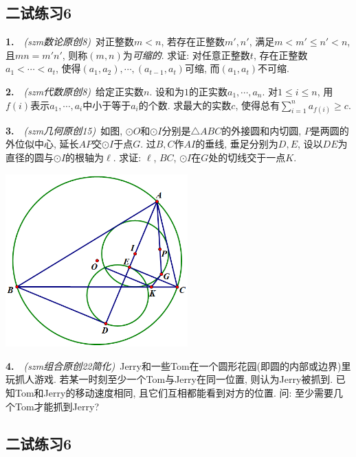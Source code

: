 \newpage
\subsection*{二试练习6}

\textbf{1.}~~\textit{(szm数论原创8)}~对正整数$m<n$, 若存在正整数$m',n'$, 满足$m<m' \leq n' <n$, 且$mn=m'n'$, 则称$(m,n)$为\textit{可缩的}. 求证: 对任意正整数$t$, 存在正整数$a_1<\cdots <a_t$, 使得$(a_1,a_2),\cdots ,(a_{t-1},a_t)$可缩, 而$(a_1,a_t)$不可缩. 

\vspace{24em}

\textbf{2.}~~\textit{(szm代数原创8)}~给定正实数$n$. 设和为$1$的正实数$a_1,\cdots ,a_n$. 对$1 \leq i \leq n$, 用$f(i)$表示$a_1,\cdots ,a_i$中小于等于$a_i$的个数. 求最大的实数$c$, 使得总有$\sum_{i=1}^{n} a_{f(i)} \geq c$. 

\newpage

\textbf{3.}~~\textit{(szm几何原创15)}~如图, $\odot O$和$\odot I$分别是$\triangle ABC$的外接圆和内切圆, $P$是两圆的外位似中心, 延长$AP$交$\odot I$于点$G$. 过$B,C$作$AI$的垂线, 垂足分别为$D,E$, 设以$DE$为直径的圆与$\odot I$的根轴为$\ell$. 求证: $\ell$, $BC$, $\odot I$在$G$处的切线交于一点$K$. 

\vspace{2em}
\includegraphics[width=7cm]{attachment/g15.png}

\vspace{8em}

\textbf{4.}~~\textit{(szm组合原创22简化)}~Jerry和一些Tom在一个圆形花园(即圆的内部或边界)里玩抓人游戏. 若某一时刻至少一个Tom与Jerry在同一位置, 则认为Jerry被抓到. 已知Tom和Jerry的移动速度相同, 且它们互相都能看到对方的位置. 问: 至少需要几个Tom才能抓到Jerry? 


\newpage
\subsection*{二试练习6}

